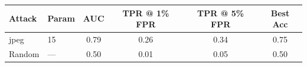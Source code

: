 \begin{tabular}{llcccc}
\toprule
Attack & Param & AUC & TPR @ 1\% FPR & TPR @ 5\% FPR & Best Acc \\
\midrule
jpeg & 15 & 0.79 & 0.26 & 0.34 & 0.75 \\
Random & — & 0.50 & 0.01 & 0.05 & 0.50 \\
\bottomrule
\end{tabular}
